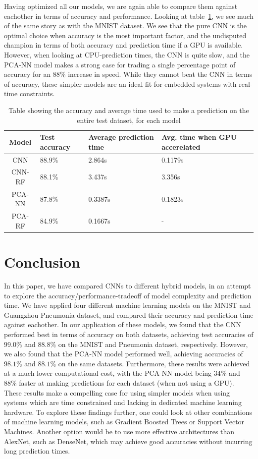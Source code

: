 \documentclass[onecolumn,10pt,cleanfoot]{asme2ej}
\begin{document}
Having optimized all our models, we are again able to compare them against eachother in terms of accuracy and performance. Looking at table~\ref{modcomppneu}, we see much of the same story as with the MNIST dataset. We see that the pure CNN is the optimal choice when accuracy is the most important factor, and the undisputed champion in terms of both accuracy and prediction time if a GPU is available. However, when looking at CPU-prediction times, the CNN is quite slow, and the PCA-NN model makes a strong case for trading a single percentage point of accuracy for an $88\%$ increase in speed. While they cannot beat the CNN in terms of accuracy, these simpler models are an ideal fit for embedded systems with real-time constraints.

\begin{table}[H]
\caption{Table showing the accuracy and average time used to make a prediction on the entire test dataset, for each model}
\begin{center}
\label{modcomppneu}
\begin{tabular}{| c | l | l | l |}
\hline
Model & Test accuracy & Average prediction time & Avg. time when GPU accerelated \\
\hline
CNN & 88.9\% & 2.864s & 0.1179s \\
CNN-RF & 88.1\% & 3.437s & 3.356s \\
PCA-NN & 87.8\% & 0.3387s & 0.1823s \\
PCA-RF & 84.9\% & 0.1667s & - \\
\hline
\end{tabular}
\end{center}
\end{table}

\section{Conclusion}

In this paper, we have compared CNNs to different hybrid models, in an attempt to explore the accuracy/performance-tradeoff of model complexity and prediction time. We have applied four different machine learning models on the MNIST and Guangzhou Pneumonia dataset, and compared their accuracy and prediction time against eachother. In our application of these models, we found that the CNN performed best in terms of accuracy on both datasets, achieving test accuracies of $99.0\%$ and $88.8\%$ on the MNIST and Pneumonia dataset, respectively. However, we also found that the PCA-NN model performed well, achieving accuracies of $98.1\%$ and $88.1\%$ on the same datasets. Furthermore, these results were achieved at a much lower computational cost, with the PCA-NN model being $34\%$ and $88\%$ faster at making predictions for each dataset (when not using a GPU). These results make a compelling case for using simpler models when using systems which are time constrained and lacking in dedicated machine learning hardware. To explore these findings further, one could look at other combinations of machine learning models, such as Gradient Boosted Trees or Support Vector Machines. Another option would be to use more effective architectures than AlexNet, such as DenseNet, which may achieve good accuracies without incurring long prediction times.



\end{document}
